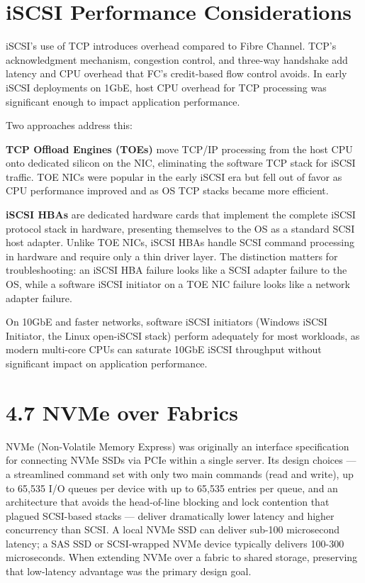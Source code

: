 \section{iSCSI Performance Considerations}
iSCSI's use of TCP introduces overhead compared to Fibre Channel. TCP's acknowledgment mechanism, congestion control, and three-way handshake add latency and CPU overhead that FC's credit-based flow control avoids. In early iSCSI deployments on 1GbE, host CPU overhead for TCP processing was significant enough to impact application performance.

Two approaches address this:

\textbf{TCP Offload Engines (TOEs)} move TCP/IP processing from the host CPU onto dedicated silicon on the NIC, eliminating the software TCP stack for iSCSI traffic. TOE NICs were popular in the early iSCSI era but fell out of favor as CPU performance improved and as OS TCP stacks became more efficient.

\textbf{iSCSI HBAs} are dedicated hardware cards that implement the complete iSCSI protocol stack in hardware, presenting themselves to the OS as a standard SCSI host adapter. Unlike TOE NICs, iSCSI HBAs handle SCSI command processing in hardware and require only a thin driver layer. The distinction matters for troubleshooting: an iSCSI HBA failure looks like a SCSI adapter failure to the OS, while a software iSCSI initiator on a TOE NIC failure looks like a network adapter failure.

On 10GbE and faster networks, software iSCSI initiators (Windows iSCSI Initiator, the Linux open-iSCSI stack) perform adequately for most workloads, as modern multi-core CPUs can saturate 10GbE iSCSI throughput without significant impact on application performance.

\section{4.7 NVMe over Fabrics}
NVMe (Non-Volatile Memory Express) was originally an interface specification for connecting NVMe SSDs via PCIe within a single server. Its design choices --- a streamlined command set with only two main commands (read and write), up to 65,535 I/O queues per device with up to 65,535 entries per queue, and an architecture that avoids the head-of-line blocking and lock contention that plagued SCSI-based stacks --- deliver dramatically lower latency and higher concurrency than SCSI. A local NVMe SSD can deliver sub-100 microsecond latency; a SAS SSD or SCSI-wrapped NVMe device typically delivers 100-300 microseconds. When extending NVMe over a fabric to shared storage, preserving that low-latency advantage was the primary design goal.

